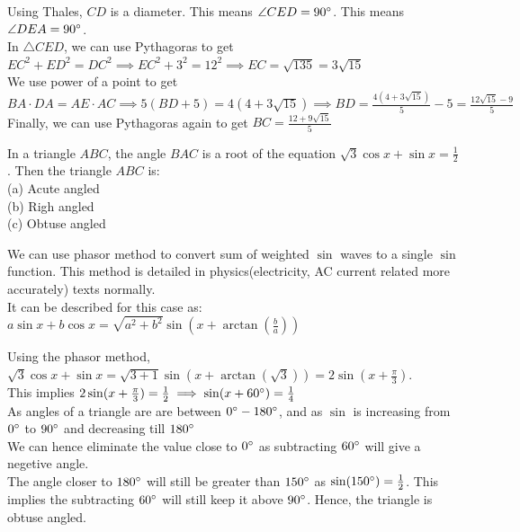 \begin{solution}
    Using Thales, $CD$ is a diameter. This means $\angle CED = 90 ^\circ$. This means $\angle DEA = 90 ^\circ$.\\
    In $\triangle{CED}$, we can use Pythagoras to get $EC^2+ED^2=DC^2 \implies EC^2+3^2=12^2 \implies EC=\sqrt{135}=3\sqrt{15}$\\
    We use power of a point to get $BA \cdot DA = AE \cdot AC \implies 5(BD+5)=4(4+3\sqrt{15})\implies BD = \frac{4(4+3\sqrt{15})}{5}-5 = \frac{12\sqrt{15}-9}{5}$\\
    Finally, we can use Pythagoras again to get $\boxed{BC=\frac{12+9 \sqrt{15}}{5}}$
\end{solution}
\begin{T}
    In a triangle $ABC$, the angle $BAC$ is a root of the equation $\sqrt3\cos x+ \sin x=\frac{1}{2}$ . Then the triangle $ABC$ is:\\
    (a) Acute angled\\
    (b) Righ angled\\
    (c) Obtuse angled\\
\end{T}
\begin{idea}
    We can use phasor method to convert sum of weighted $\sin$ waves to a single $\sin$ function. This method is detailed in physics(electricity, AC current related more accurately) texts normally.\\
    It can be described for this case as:\\
    $a\sin x + b\cos x = \sqrt{a^2+b^2} \sin (x+\arctan(\frac{b}{a}))$
\end{idea}
\begin{solution}
    Using the phasor method, $\sqrt{3}\cos x + \sin x = \sqrt{3+1} \sin(x+\arctan(\sqrt{3}))=2\sin(x+\frac{\pi}{3})$.\\
    This implies $2\sin(x+\frac{\pi}{3}) = \frac{1}{2} \implies \sin(x+60^\circ)=\frac{1}{4}$\\
    As angles of a triangle are are between $0^\circ - 180^\circ$, and as $\sin$ is increasing from $0^\circ$ to $90^\circ$ and decreasing till $180 ^\circ$\\
    We can hence eliminate the value close to $0^\circ$ as subtracting $60^\circ$ will give a negetive angle.\\
    The angle closer to $180^\circ$ will still be greater than $150^\circ$ as $\sin(150 ^\circ)=\frac{1}{2}$. This implies the subtracting $60 ^\circ$ will still keep it above $90 ^\circ$. Hence, the triangle is obtuse angled.\\
\end{solution}
